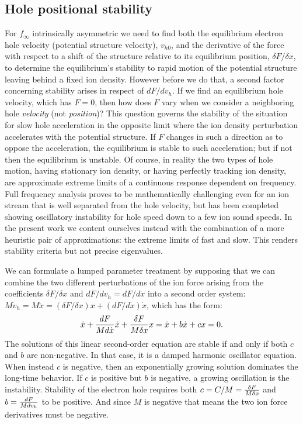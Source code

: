 \documentclass[12pt]{article}
\begin{document}
\subsection{Hole positional stability}
\label{3.2}

For $f_\infty$ intrinsically asymmetric we need to find both the
equilibrium electron hole velocity (potential structure velocity),
$v_{h0}$, and the derivative of the force with respect to a shift of
the structure relative to its equilibrium position,
$\delta F/\delta x$, to determine the equilibrium's stability to rapid
motion of the potential structure leaving behind a fixed ion
density. However before we do that, a second factor concerning
stability arises in respect of $dF/dv_h$. If we find an equilibrium
hole velocity, which has $F=0$, then how does $F$ vary when we
consider a neighboring hole \emph{velocity} (not \emph{position})?
This question governs the stability of the situation for slow hole
acceleration in the opposite limit where the ion density perturbation
accelerates with the potential structure. If $F$ changes in such a
direction as to oppose the acceleration, the equilibrium is stable to
such acceleration; but if not then the equilibrium is unstable. Of
course, in reality the two types of hole motion, having stationary ion
density, or having perfectly tracking ion density, are approximate
extreme limits of a continuous response dependent on frequency. Full
frequency analysis proves to be mathematically challenging even for an
ion stream that is well separated from the hole velocity, but has been
completed showing oscillatory instability for hole speed down to a few
ion sound speeds\cite{Zhou2017}.  In the present work we content
ourselves instead with the combination of a more heuristic pair of
approximations: the extreme limits of fast and slow. This renders
stability criteria but not precise eigenvalues.


We can formulate a lumped parameter treatment by supposing that we
can combine the two different perturbations of the ion force arising from
the coefficients $\delta F/\delta x$ and $dF/dv_h=dF/d\dot x$ into a
second order system:
$M\dot v_h= M\ddot x = (\delta F/\delta x) x + (dF/d\dot x) \dot x$,
which has the form:
\begin{equation}
  \label{eq:harmosc}
  \ddot x +{dF\over Md\dot x}\dot x+{\delta F\over M\delta x} x= \ddot x+
   b\dot x + c x=0.
\end{equation}
The solutions of this linear second-order equation are stable if and
only if both $c$ and $b$ are non-negative. In that case, it is a damped
harmonic oscillator equation. When instead $c$ is negative, then an
exponentially growing solution dominates the long-time behavior. If
$c$ is positive but $b$ is negative, a growing oscillation is the
instability. Stability of the electron hole requires both $c=C/M={\delta
  F\over M\delta x}$ and $b={dF\over Md v_h}$ to be positive. And
since $M$ is negative that means the two ion force derivatives must be
negative. 
\end{document}

